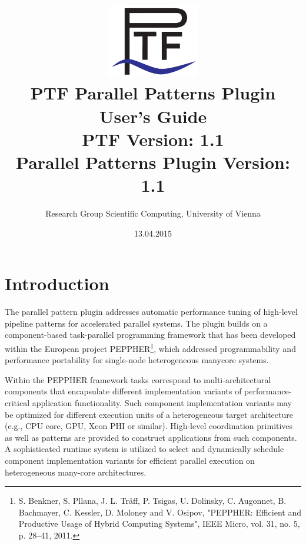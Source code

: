 \documentclass[11pt,a4paper, oneside]{book} %
\begin{document}
\title{\includegraphics[width=4cm]{../images/Ptf_LogoBlau}\\ \vspace{1cm}
\textsf{\bf \huge PTF Parallel Patterns Plugin\\ User's Guide}\\
       \normalsize PTF Version: 1.1\\
       Parallel Patterns Plugin Version: 1.1}
\author{Research Group Scientific Computing, University of Vienna}
\date{13.04.2015}


\maketitle
\tableofcontents

\chapter{Introduction}


The parallel pattern plugin addresses automatic performance tuning of high-level pipeline patterns for
accelerated parallel systems. The plugin builds on a component-based task-parallel programming
framework that has been developed within the European project PEPPHER\footnote{ S. Benkner,
S. Pllana, J. L. Tr\"{a}ff, P. Tsigas, U. Dolinsky, C. Augonnet, B. Bachmayer, C. Kessler, D. Moloney
and V. Osipov, "PEPPHER: Efficient and Productive Usage of Hybrid Computing Systems", IEEE Micro,
vol. 31, no. 5, p. 28–41, 2011.}, which addressed programmability and performance portability for
single-node heterogeneous manycore systems.

Within the PEPPHER framework tasks correspond to multi-architectural
components that encapsulate different implementation variants of performance-critical application
functionality. Such component implementation variants may be optimized for different execution units of
a heterogeneous target architecture (e.g., CPU core, GPU, Xeon PHI or similar). High-level coordination
primitives as well as patterns are provided to construct applications from such components.
A sophisticated runtime system is utilized to select and dynamically schedule component implementation
variants for efficient parallel execution on heterogeneous many-core architectures.
\end{document}

